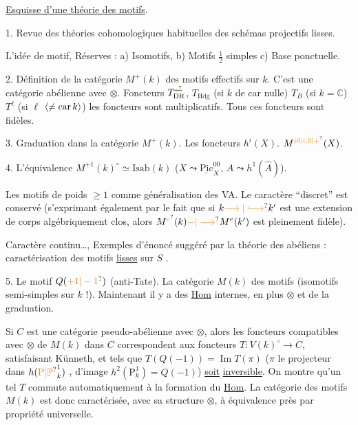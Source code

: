 \uline{Esquisse d'une théorie des motifs}.

1. Revue des théories cohomologiques habituelles des schémas projectifs lisses.

\margin{$*$}L'idée de motif,  Réserves : a) Isomotifs, b) Motifs $\frac12$ simples c) Base ponctuelle.

2. Définition de la catégorie $M^+(k)$ des motifs effectifs sur $k$.
C'est une catégorie abélienne  avec $\otimes$. Foncteurs $T_{\mathrm{DR}}^{\deleted{\unsure{*}}}$, $T_{\mathrm{Hdg}}$ (si $k$ de car nulle) $T_B$ (si $k=\mathbb C$) $T^\ell$ (si $\ell$  $\inserted{\ne\operatorname{car} k}$) les foncteurs sont multiplicatifs. Tous ces foncteurs sont fidèles.

3. Graduation dans la catégorie $M^+(k)$.  Les foncteurs $h^i(X)$. $M^{\unsure{i0|i,0|+}}(X)$.

4. L'équivalence $M^{+1}(k)^\circ \simeq \mathrm{Isab}(k)$ ($X\leadsto\underline{\mathrm{Pic}}^{00}_{X}$, $A\leadsto h^1(\hat A)$).


\margin{$*$}Les motifs de poids $\geq1$ comme généralisation des VA. Le caractère ``discret'' est conservé (s'exprimant également par le fait que si $k\unsure{\longrightarrow|\lhook\joinrel\longrightarrow} k'$ est une extension de corps algébriquement clos, alors $M^{\unsure{e}}(k)\unsure{-|\longrightarrow}M^e(k')$ est pleinement fidèle).

\margin{$*$}Caractère continu\ldots, Exemples d'énoncé suggéré par la théorie des  abéliens : caractérisation des motifs \uline{lisses} sur $S$ .

5. Le motif $Q(\unsure{+1|-1})$ (anti-Tate). La catégorie $M(k)$ des motifs (isomotifs semi-simples sur $k$ !). Maintenant il y a des \uline{Hom} internes, en plus  $\otimes$ et de la graduation.

Si $C$ est une catégorie pseudo-abélienne avec $\otimes$, alors les foncteurs compatibles avec $\otimes$ de $M(k)$ dans $C$ correspondent aux foncteurs $T:V(k)^\circ\longrightarrow C$, satisfaisant Künneth, et tels que  $T(Q(-1))=\operatorname{Im} T(\pi)$ ($\pi$ le projecteur dans $h(\unsure{\mathrm P|\mathbb P}^1_k)$ , d'image $h^2(\mathrm P^1_k)=Q(-1)$) \uline{soit} \uline{inversible}. On montre qu'un tel $T$ commute automatiquement à la formation du \uline{Hom}. La catégorie des motifs $M(k)$ est donc caractérisée, avec sa structure $\otimes$,  à équivalence près par propriété universelle.


